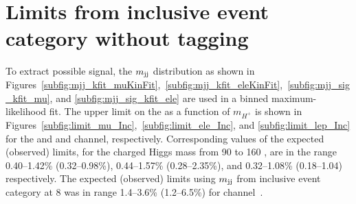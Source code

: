 
\section{Limits from inclusive event category without  tagging}
\label{ss:limit_Inc}
To extract possible signal, the $m_\text{jj}$ distribution as shown in Figures~\ref{subfig:mjj_kfit_muKinFit},~\ref{subfig:mjj_kfit_eleKinFit},~\ref{subfig:mjj_sig_kfit_mu}, and \ref{subfig:mjj_sig_kfit_ele} are used in a binned maximum-likelihood fit. The upper limit on the \brThb as a function of $m_{H^{+}}$ is 
shown in Figures~\ref{subfig:limit_mu_Inc},~\ref{subfig:limit_ele_Inc}, and \ref{subfig:limit_lep_Inc}
for the \mujets and \ejets and \ljets channel, respectively. 
Corresponding values of the expected (observed) limits, for the charged Higgs mass 
from 90 to 160 \GeV, are in the range 0.40--1.42\% (0.32--0.98\%), 0.44--1.57\% (0.28--2.35\%), 
and 0.32--1.08\% (0.18--1.04) respectively. The expected (observed) limits using $m_\text{jj}$ from 
inclusive event category at 8 \TeV was in range 1.4--3.6\% (1.2--6.5\%) for \ljets 
channel~\cite{Khachatryan:2015uua}.
